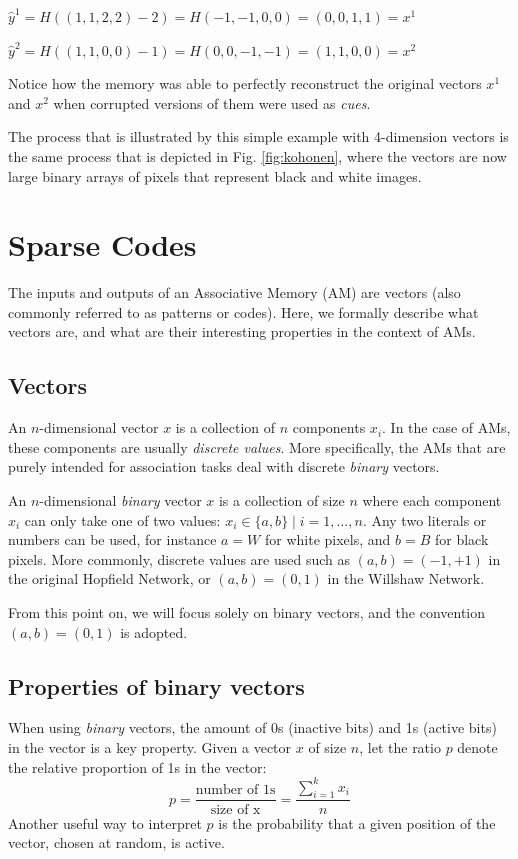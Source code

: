 \documentclass[runningheads]{llncs}
\begin{document}
$\hat{y}^1 = H((1,1,2,2) - 2) = H(-1,-1,0,0) = (0,0,1,1) = x^1$

$\hat{y}^2 = H((1,1,0,0) - 1) = H(0,0,-1,-1) = (1,1,0,0) = x^2$
\newline

Notice how the memory was able to perfectly reconstruct the original vectors $x^1$ and $x^2$ when corrupted versions of them were used as \textit{cues}. 

The process that is illustrated by this simple example with 4-dimension vectors is the same process that is depicted in Fig. \ref{fig:kohonen}, where the vectors are now large binary arrays of pixels that represent black and white images.

\section{Sparse Codes}
\label{sec:inputoutput}
The inputs and outputs of an Associative Memory (AM) are vectors (also commonly referred to as patterns or codes). Here, we formally describe what vectors are, and what are their interesting properties in the context of AMs.
\subsection{Vectors}
\label{sec:inputoutput_def}
An $n$-dimensional vector $x$ is a collection of  $n$ components $x_i$. In the case of AMs, these components are usually \textit{discrete values}. More specifically, the AMs that are purely intended for association tasks deal with discrete \textit{binary} vectors.

An $n$-dimensional \textit{binary} vector $x$ is a collection of size $n$ where each component $x_i$ can only take one of two values: $x_i \in \{ a,b \} \mid i=1, \dots,n$.
Any two literals or numbers can be used, for instance $a=W$ for white pixels, and $b=B$ for black pixels. More commonly, discrete values are used such as $(a,b)=(-1,+1)$ in the original Hopfield Network, or $(a,b)=(0,1 )$ in the Willshaw Network.
\newline

From this point on, we will focus solely on binary vectors, and the convention $(a,b)=(0,1)$ is adopted.

\subsection{Properties of binary vectors}
\label{sec:inputoutput_propbin}
When using \textit{binary} vectors, the amount of 0s (inactive bits) and 1s (active bits) in the vector is a key property.
Given a vector $x$ of size $n$, let the ratio $p$ denote the relative proportion of 1s in the vector:
\begin{equation}
    p = \frac{\text{number of 1s}}{\text{size of x}} =  \frac{\sum\limits_{i=1}^k{x_i}}{n}
\end{equation}
Another useful way to interpret $p$ is the probability that a given position of the vector, chosen at random, is active.
\end{document}
